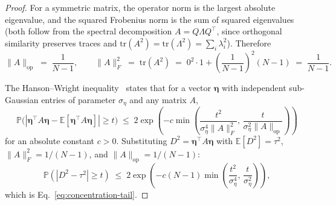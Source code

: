 \documentclass{article}
\begin{document}
\begin{proof}
For a symmetric matrix, the operator norm is the largest absolute eigenvalue, and the squared Frobenius norm is the sum of squared eigenvalues (both follow from the spectral decomposition $A = Q\Lambda Q^\top$, since orthogonal similarity preserves traces and $\mathrm{tr}(A^2) = \mathrm{tr}(\Lambda^2) = \sum_i \lambda_i^2$). Therefore
\begin{equation*}
\|A\|_{\mathrm{op}} \;=\; \frac{1}{N-1}, \qquad 
\|A\|_F^2 \;=\; \mathrm{tr}(A^2) \;=\; 0^2 \cdot 1 + \left(\frac{1}{N-1}\right)^{\!2}\!(N-1) \;=\; \frac{1}{N-1}.
\end{equation*}

The Hanson--Wright inequality~\citep{rudelson2013hanson} states that for a vector $\boldsymbol{\eta}$ with independent sub-Gaussian entries of parameter $\sigma_\eta$ and any matrix $A$,
\begin{equation}
\mathbb{P}\!\big(|\boldsymbol{\eta}^\top A \boldsymbol{\eta} - \mathbb{E}[\boldsymbol{\eta}^\top A \boldsymbol{\eta}]| \geq t\big) \;\leq\; 2\exp\!\left(-c\min\!\left(\frac{t^2}{\sigma_\eta^4 \|A\|_F^2},\,\frac{t}{\sigma_\eta^2 \|A\|_{\mathrm{op}}}\right)\right)
\label{eq:hanson-wright}
\end{equation}
for an absolute constant $c > 0$. Substituting $D^2 = \boldsymbol{\eta}^\top A \boldsymbol{\eta}$ with $\mathbb{E}[D^2]=\tau^2$, $\|A\|_F^2 = 1/(N-1)$, and $\|A\|_{\mathrm{op}} = 1/(N-1)$:
\begin{equation*}
\mathbb{P}(|D^2 - \tau^2| \geq t) \;\leq\; 2\exp\!\left(-c(N-1)\min\!\left(\frac{t^2}{\sigma_\eta^4},\,\frac{t}{\sigma_\eta^2}\right)\right),
\end{equation*}
which is Eq.~\ref{eq:concentration-tail}.


\end{proof}
\end{document}
